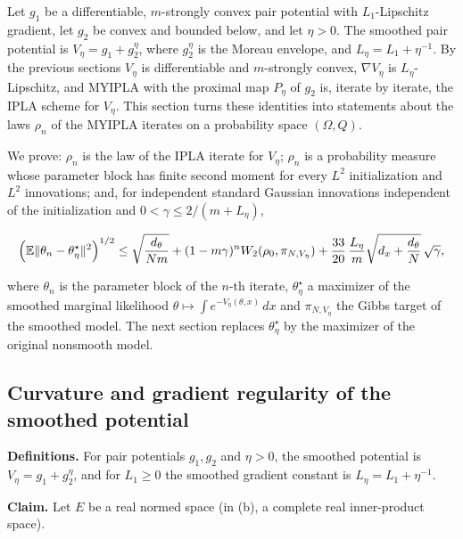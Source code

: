 \documentclass[11pt,a4paper]{report}
\begin{document}
Let \(g_1\) be a differentiable, \(m\)-strongly convex pair potential with \(L_1\)-Lipschitz gradient, let \(g_2\) be convex and bounded below, and let \(\eta>0\). The smoothed pair potential is \(V_\eta=g_1+g_2^\eta\), where \(g_2^\eta\) is the Moreau envelope, and \(L_\eta=L_1+\eta^{-1}\). By the previous sections \(V_\eta\) is differentiable and \(m\)-strongly convex, \(\nabla V_\eta\) is \(L_\eta\)-Lipschitz, and MYIPLA with the proximal map \(P_\eta\) of \(g_2\) is, iterate by iterate, the IPLA scheme for \(V_\eta\). This section turns these identities into statements about the laws \(\rho_n\) of the MYIPLA iterates on a probability space \((\Omega,Q)\).




We prove: \(\rho_n\) is the law of the IPLA iterate for \(V_\eta\); \(\rho_n\) is a probability measure whose parameter block has finite second moment for every \(L^2\) initialization and \(L^2\) innovations; and, for independent standard Gaussian innovations independent of the initialization and \(0<\gamma\le2/(m+L_\eta)\),


\[\Bigl(\mathbb E\|\theta_n-\theta^\star_\eta\|^2\Bigr)^{1/2}\le\sqrt{\frac{d_\theta}{Nm}}+(1-m\gamma)^nW_2(\rho_0,\pi_{N,V_\eta})+\frac{33}{20}\,\frac{L_\eta}{m}\sqrt{d_x+\frac{d_\theta}N}\,\sqrt\gamma,\]


where \(\theta_n\) is the parameter block of the \(n\)-th iterate, \(\theta^\star_\eta\) a maximizer of the smoothed marginal likelihood \(\theta\mapsto\int e^{-V_\eta(\theta,x)}\,dx\) and \(\pi_{N,V_\eta}\) the Gibbs target of the smoothed model. The next section replaces \(\theta^\star_\eta\) by the maximizer of the original nonsmooth model.

\subsection{\texorpdfstring{Curvature and gradient regularity of the smoothed potential}{Curvature and gradient regularity of the smoothed potential}}
\label{report-step-ProximalLangevin-MYIPLA-lean-1}


\textbf{Definitions.} For pair potentials \(g_1,g_2\) and \(\eta>0\), the smoothed potential is \(V_\eta=g_1+g_2^\eta\), and for \(L_1\ge0\) the smoothed gradient constant is \(L_\eta=L_1+\eta^{-1}\).




\textbf{Claim.} Let \(E\) be a real normed space (in (b), a complete real inner-product space).
\end{document}
